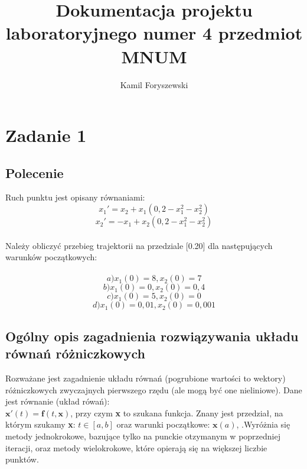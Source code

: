 \documentclass[a4paper, 11pt]{article}
\author{Kamil Foryszewski}
\title{Dokumentacja projektu laboratoryjnego numer 4 przedmiot MNUM}
\begin{document}

\maketitle
\tableofcontents

\section{Zadanie 1}
\subsection{Polecenie}
Ruch punktu jest opisany równaniami:
$$ x_{1}' = x_{2} + x_{1}(0,2 - x_{1}^{2} - x_{2}^{2}) $$
$$ x_{2}' = -x_{1} + x_{2}(0,2 - x_{1}^{2} - x_{2}^{2}) $$\\
Należy obliczyć przebieg trajektorii na przedziale [0.20] dla następujących warunków początkowych: \\
\\
 $$a) x_{1}(0) = 8 ,  x_{2}(0) = 7 $$
 $$b) x_{1}(0) = 0 , x_{2}(0) = 0,4 $$
 $$c) x_{1}(0) = 5 , x_{2}(0) = 0 $$
 $$d) x_{1}(0) = 0,01 , x_{2}(0) = 0,001 $$
 
\subsection{Ogólny opis zagadnienia rozwiązywania układu równań różniczkowych}
Rozważane jest zagadnienie układu równań (pogrubione wartości to wektory) różniczkowych zwyczajnych pierwszego rzędu (ale mogą być one nieliniowe).
Dane jest równanie (układ rówań):\\
$ \mathbf{x'}(t) = \mathbf{f}(t,\mathbf{x}) $, przy czym \textbf{x} to szukana funkcja. Znany jest przedział, na którym szukamy \textbf{x}: $t \in [a,b]$ oraz warunki początkowe: $\mathbf{x}(a)$, .Wyróżnia się metody jednokrokowe, bazujące tylko na punckie otzymanym w poprzedniej iteracji, oraz metody wielokrokowe, które opierają się na większej liczbie punktów.\\
\end{document}

